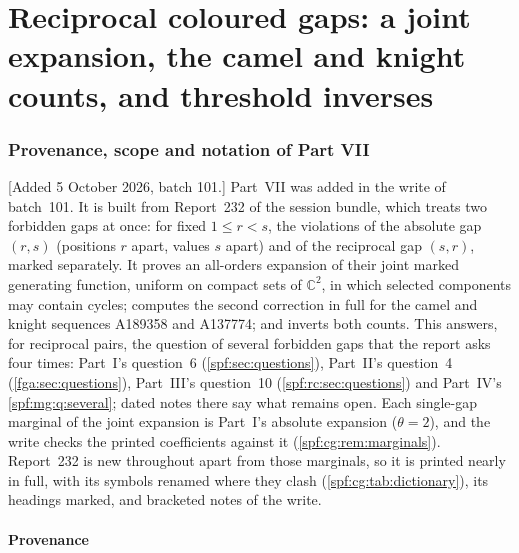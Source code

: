 \documentclass[11pt]{article}
\numberwithin{equation}{section}
\theoremstyle{definition}
\theoremstyle{remark}
\theoremstyle{definition}
\begin{document}
\part{Reciprocal coloured gaps: a joint expansion, the camel and knight counts, and threshold inverses}
\label{spf:cg:part}

\section{Provenance, scope and notation of Part VII}
\label{spf:cg:sec:front}

[Added 5 October 2026, batch 101.] Part~VII was added in the write of
batch~101. It is built from Report~232 of the session bundle, which treats
two forbidden gaps at once: for fixed $1\le r<s$, the violations of the
absolute gap $(r,s)$ (positions $r$ apart, values $s$ apart) and of the
reciprocal gap $(s,r)$, marked separately. It proves an all-orders expansion
of their joint marked generating function, uniform on compact sets of
$\mathbb C^2$, in which selected components may contain cycles; computes the
second correction in full for the camel and knight sequences A189358
and A137774; and inverts both counts. This answers, for reciprocal pairs, the
question of several forbidden gaps that the report asks four times: Part~I's
question~6 (\cref{spf:sec:questions}), Part~II's question~4
(\cref{fga:sec:questions}), Part~III's question~10
(\cref{spf:rc:sec:questions}) and Part~IV's \cref{spf:mg:q:several}; dated
notes there say what remains open. Each single-gap marginal of the joint
expansion is Part~I's absolute expansion ($\theta=2$), and the write checks
the printed coefficients against it (\cref{spf:cg:rem:marginals}). Report~232
is new throughout apart from those marginals, so it is printed nearly in
full, with its symbols renamed where they clash
(\cref{spf:cg:tab:dictionary}), its headings marked, and bracketed notes of
the write.

\subsection{Provenance}
\label{spf:cg:sec:provenance}
\end{document}
